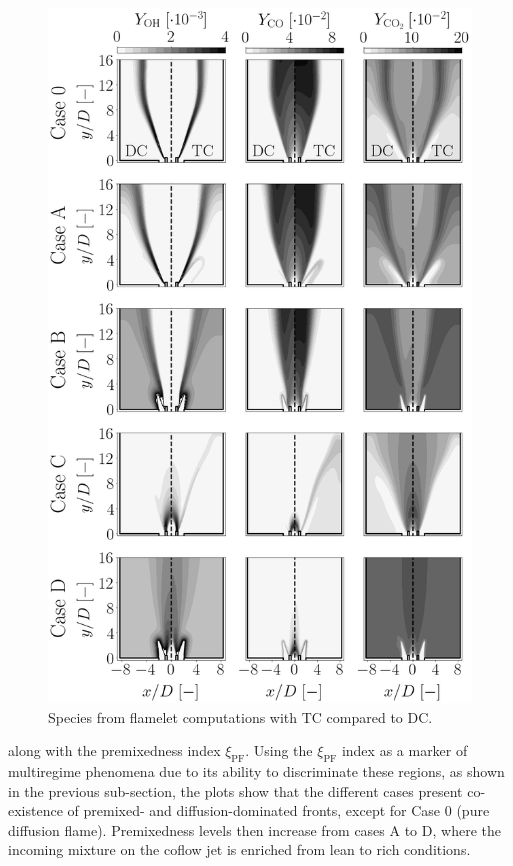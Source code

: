 \documentclass[preprint,12pt,authoryear]{elsarticle}
\begin{document}
{\begin{figure}[h!]
\centering
	\includegraphics[scale=0.25]{./figures/fts_maps_OH_CO_CO2}
	\caption{Species from flamelet computations with TC compared to DC.}
	\label{fig:fts_maps_OH_CO_CO2}
\end{figure}




\clearpage


along with the premixedness index $\xi_\mathrm{PF}$. Using the $\xi_\mathrm{PF}$ index as a marker of multiregime phenomena due to its ability to discriminate these regions, as shown in the previous sub-section, the plots show that the different cases present co-existence of premixed- and diffusion-dominated fronts, except for Case 0 (pure diffusion flame). Premixedness levels then increase from cases A to D,
where the incoming mixture on the coflow jet is enriched from lean to rich conditions. 


}
\end{document}
